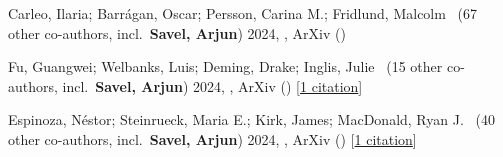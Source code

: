 \item[{\color{numcolor}\scriptsize3}] Carleo, Ilaria; Barr{\'a}gan, Oscar; Persson, Carina M.; Fridlund, Malcolm \etal\ ({67} other co-authors, incl.\ \textbf{Savel, Arjun}) 2024, , ArXiv ()

\item[{\color{numcolor}\scriptsize2}] Fu, Guangwei; Welbanks, Luis; Deming, Drake; Inglis, Julie \etal\ ({15} other co-authors, incl.\ \textbf{Savel, Arjun}) 2024, , ArXiv () [\href{https://ui.adsabs.harvard.edu/abs/2024arXiv240706163F}{1 citation}]

\item[{\color{numcolor}\scriptsize1}] Espinoza, N{\'e}stor; Steinrueck, Maria E.; Kirk, James; MacDonald, Ryan J. \etal\ ({40} other co-authors, incl.\ \textbf{Savel, Arjun}) 2024, , ArXiv () [\href{https://ui.adsabs.harvard.edu/abs/2024arXiv240710294E}{1 citation}]